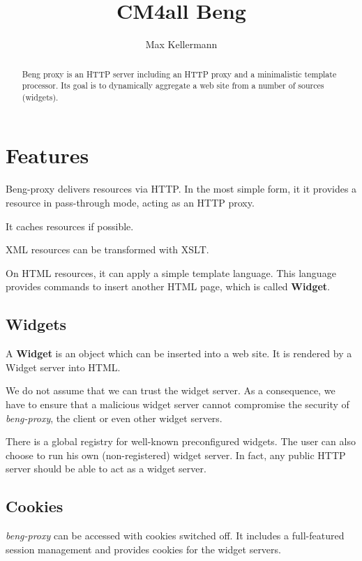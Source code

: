 \documentclass[a4paper,12pt]{article}
\begin{document}
\title{CM4all Beng}
\author{Max Kellermann}

\maketitle

\begin{abstract}
Beng proxy is an HTTP server including an HTTP proxy and a
minimalistic template processor.  Its goal is to dynamically aggregate
a web site from a number of sources (widgets).
\end{abstract}

\setcounter{tocdepth}{2}
\tableofcontents
\newpage

\section{Features}

Beng-proxy delivers resources via HTTP.  In the most simple form, it
it provides a resource in pass-through mode, acting as an HTTP proxy.

It caches resources if possible.

XML resources can be transformed with XSLT.

On HTML resources, it can apply a simple template language.  This
language provides commands to insert another HTML page, which is
called \textbf{Widget}.

\subsection{Widgets}

A \textbf{Widget} is an object which can be inserted into a web site.
It is rendered by a Widget server into HTML.

We do not assume that we can trust the widget server.  As a
consequence, we have to ensure that a malicious widget server cannot
compromise the security of \emph{beng-proxy}, the client or even other
widget servers.

There is a global registry for well-known preconfigured widgets.  The
user can also choose to run his own (non-registered) widget server.
In fact, any public HTTP server should be able to act as a widget
server.


\subsection{Cookies}

\emph{beng-proxy} can be accessed with cookies switched off.  It includes a
full-featured session management and provides cookies for the widget
servers.
\end{document}

